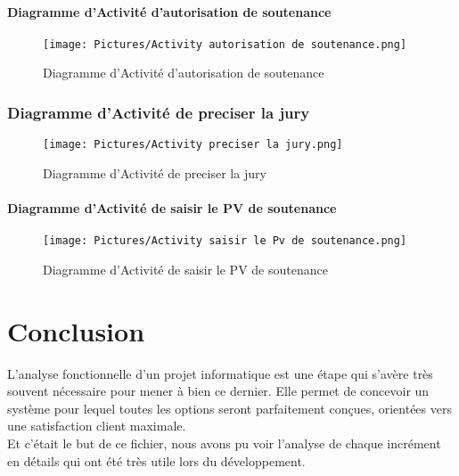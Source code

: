 \documentclass[11pt,fleqn]{book} %
\begin{document}
\subsubsection{Diagramme d'Activité d'autorisation de soutenance}
\begin{figure}[h]
    \centering
    \texttt{[image: Pictures/Activity autorisation de soutenance.png]}
    \caption{Diagramme d'Activité d'autorisation de soutenance}
    \label{fig:pca}
\end{figure}
\newpage
\subsection{Diagramme d'Activité de preciser la jury}
\begin{figure}[h]
    \centering
    \texttt{[image: Pictures/Activity preciser la jury.png]}
    \caption{Diagramme d'Activité de preciser la jury}
    \label{fig:pca}
\end{figure}
\newpage
\subsubsection{Diagramme d'Activité de saisir le PV de soutenance}
\begin{figure}[h]
    \centering
    \texttt{[image: Pictures/Activity saisir le Pv de soutenance.png]}
    \caption{Diagramme d'Activité de saisir le PV de soutenance}
    \label{fig:pca}
\end{figure}
\chapter{Conclusion}
L'analyse fonctionnelle d'un projet informatique est une étape qui s'avère très souvent nécessaire pour mener à bien ce dernier. Elle permet de concevoir un système pour 
lequel toutes les options seront parfaitement conçues, orientées vers une satisfaction 
client maximale.  \\
Et c’était le but de ce fichier, nous avons pu voir l’analyse de chaque incrément en détails qui ont été très utile lors du développement.
\listoffigures
\end{document}
